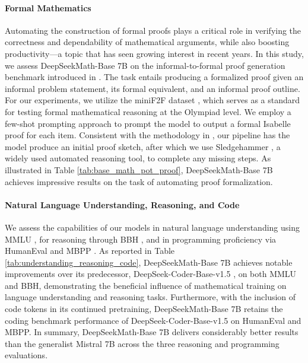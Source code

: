 \begin{itemize}[topsep=0pt]
\paragraph{Formal Mathematics}

Automating the construction of formal proofs plays a critical role in verifying the correctness and dependability of mathematical arguments, while also boosting productivity—a topic that has seen growing interest in recent years. In this study, we assess DeepSeekMath-Base 7B on the informal-to-formal proof generation benchmark introduced in \citep{dsp_proof}. The task entails producing a formalized proof given an informal problem statement, its formal equivalent, and an informal proof outline. For our experiments, we utilize the miniF2F dataset \citep{minif2f}, which serves as a standard for testing formal mathematical reasoning at the Olympiad level. We employ a few-shot prompting approach to prompt the model to output a formal Isabelle proof for each item. Consistent with the methodology in \cite{dsp_proof}, our pipeline has the model produce an initial proof sketch, after which we use Sledgehammer \citep{sledgehammer}, a widely used automated reasoning tool, to complete any missing steps. As illustrated in Table \ref{tab:base_math_pot_proof}, DeepSeekMath-Base 7B achieves impressive results on the task of automating proof formalization.

\paragraph{Natural Language Understanding, Reasoning, and Code}

We assess the capabilities of our models in natural language understanding using MMLU \citep{mmlu}, for reasoning through BBH \citep{bbh}, and in programming proficiency via HumanEval \citep{codex} and MBPP \citep{mbpp}. As reported in Table \ref{tab:understanding_reasoning_code}, DeepSeekMath-Base 7B achieves notable improvements over its predecessor, DeepSeek-Coder-Base-v1.5 \citep{deepseek-coder}, on both MMLU and BBH, demonstrating the beneficial influence of mathematical training on language understanding and reasoning tasks. Furthermore, with the inclusion of code tokens in its continued pretraining, DeepSeekMath-Base 7B retains the coding benchmark performance of DeepSeek-Coder-Base-v1.5 on HumanEval and MBPP. In summary, DeepSeekMath-Base 7B delivers considerably better results than the generalist Mistral 7B \citep{mistral} across the three reasoning and programming evaluations.


\end{itemize}
